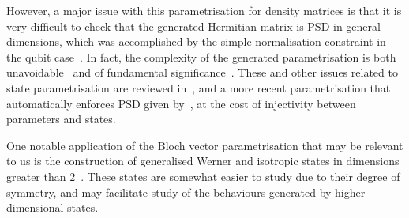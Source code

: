 \documentclass[10pt, a4paper]{article}
\numberwithin{equation}{section} %
\theoremstyle{definition}
\theoremstyle{plain}
\newcommand{\?}{\mathrel{?}} %
\begin{document}
\begin{appendices}
                    However, a major issue with this parametrisation for density matrices is that it is very difficult to check that the generated Hermitian matrix is PSD in general dimensions, which was accomplished by the simple normalisation constraint in the qubit case~\cite{DensMatParam}. In fact, the complexity of the generated parametrisation is both unavoidable~\cite{NoHigherEuclideanRepr} and of fundamental significance~\cite{InfoAsymStateSpace}. These and other issues related to state parametrisation are reviewed in~\cite{DensMatParam}, and a more recent parametrisation that automatically enforces PSD given by~\cite{SquaringParam}, at the cost of injectivity between parameters and states.

                    One notable application of the Bloch vector parametrisation that may be relevant to us is the construction of generalised Werner and isotropic states in dimensions greater than 2~\cite{WernerIsotropicDecomp}. These states are somewhat easier to study due to their degree of symmetry, and may facilitate study of the behaviours generated by higher-dimensional states. 

                  \end{appendices}

                  
\end{document}
